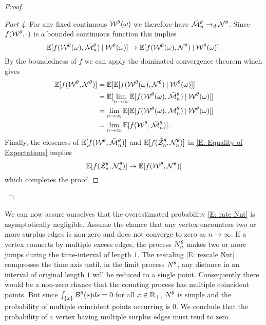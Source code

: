 \begin{proof}
\begin{proof}[Part 4]
For any fixed continuous $\mathcal{W}^{\theta}(\omega)$ we therefore have $\bar{\mathcal{M}}_n^{\theta} \rightarrow_d \mathcal{N}^{\theta}$.
Since $f(\mathcal{W}^{\theta}, \cdot)$ is a bounded continuous function this implies
\begin{equation}
	\mathbb{E}[f(\mathcal{W}^{\theta}(\omega), \bar{\mathcal{M}}_n^{\theta}) \: | \: \mathcal{W}^{\theta}(\omega)] \rightarrow \mathbb{E}[f(\mathcal{W}^{\theta}(\omega), \mathcal{N}^{\theta})\: | \: \mathcal{W}^{\theta}(\omega)].
\end{equation}
By the boundedness of $f$ we can apply the dominated convergence theorem which gives
\begin{equation}
	\begin{aligned}
	\mathbb{E}[f(\mathcal{W}^{\theta}, \mathcal{N}^{\theta})]
	&= \mathbb{E}[ \mathbb{E}[f(\mathcal{W}^{\theta}(\omega), \mathcal{N}^{\theta}) \: | \: \mathcal{W}^{\theta}(\omega)] ] \\
	&= \mathbb{E}[ \lim_{n\rightarrow\infty} \mathbb{E}[f(\mathcal{W}^{\theta}(\omega), \bar{\mathcal{M}}_n^{\theta}) \: | \: \mathcal{W}^{\theta}(\omega)] ] \\
	&= \lim_{n\rightarrow\infty} \mathbb{E}[ \mathbb{E}[f(\mathcal{W}^{\theta}(\omega), \bar{\mathcal{M}}_n^{\theta}) \: | \: \mathcal{W}^{\theta}(\omega)] ] \\
	&= \lim_{n\rightarrow\infty} \mathbb{E}[ f(\mathcal{W}^{\theta}, \bar{\mathcal{M}}_n^{\theta}) ].
	\end{aligned}
\end{equation}
Finally, the closeness of $\mathbb{E}[ f(\mathcal{W}^{\theta}, \bar{\mathcal{M}}_n^{\theta}) ]$ and $\mathbb{E}[f(\bar{\mathcal{Z}}^{\theta}_n, \mathcal{N}_n^{\theta})]$ in \eqref{E: Equality of Expectations} implies
\begin{equation}
	\mathbb{E}[f(\bar{\mathcal{Z}}^{\theta}_n, \mathcal{N}_n^{\theta})] \rightarrow \mathbb{E}[f(\mathcal{W}^{\theta}, \mathcal{N}^{\theta})]
\end{equation}
which completes the proof.
\end{proof}
\end{proof}

\bigskip

We can now assure ourselves that the overestimated probability \eqref{E: rate Nnt} is asymptotically negligible.
Assume the chance that any vertex encounters two or more surplus edges is non-zero and does not converge to zero as $n \rightarrow \infty$.
If a vertex connects by multiple excess edges, the process $N_n^{\theta}$ makes two or more jumps during the time-interval of length $1$.
The rescaling \eqref{E: rescale Nnt} compresses the time axis until, in the limit process $N^{\theta}$, 
any distance in an interval of original length $1$ will be reduced to a single point.
Consequently there would be a non-zero chance that the counting process has multiple coincident points.
But since $\int_{\{x\}} B^{\theta}(s)ds = 0$ for all $x \in \mathbb{R}_+$, 
$N^{\theta}$ is simple and the probability of multiple coincident points occurring is $0$.
We conclude that the probability of a vertex having multiple surplus edges must tend to zero.


